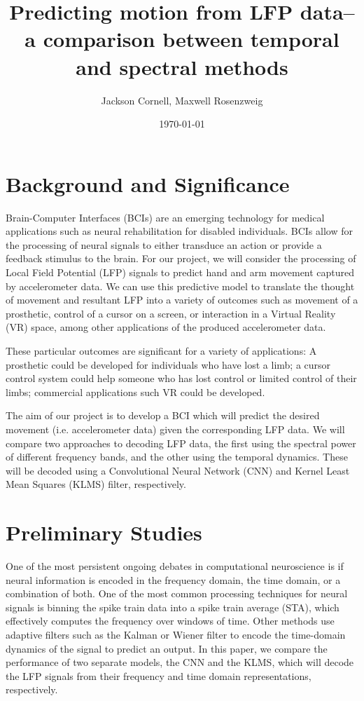 \documentclass[12pt]{article}
\title{Predicting motion from LFP data--a comparison between temporal and spectral methods}
\author{Jackson Cornell, Maxwell Rosenzweig}
\date{\today}
\begin{document}
\maketitle


\section{Background and Significance}

Brain-Computer Interfaces (BCIs) are an emerging technology for medical applications such as neural rehabilitation for disabled individuals. BCIs allow for the processing of neural signals to either transduce an action or provide a feedback stimulus to the brain. For our project, we will consider the processing of Local Field Potential (LFP) signals to predict hand and arm movement captured by accelerometer data. We can use this predictive model to translate the thought of movement and resultant LFP into a variety of outcomes such as movement of a prosthetic, control of a cursor on a screen, or interaction in a Virtual Reality (VR) space, among other applications of the produced accelerometer data.

These particular outcomes are significant for a variety of applications: A prosthetic could be developed for individuals who have lost a limb; a cursor control system could help someone who has lost control or limited control of their limbs; commercial applications such VR could be developed.

The aim of our project is to develop a BCI which will predict the desired movement (i.e. accelerometer data) given the corresponding LFP data. We will compare two approaches to decoding LFP data, the first using the spectral power of different frequency bands, and the other using the temporal dynamics. These will be decoded using a Convolutional Neural Network (CNN) and Kernel Least Mean Squares (KLMS) filter, respectively.


\section{Preliminary Studies}

One of the most persistent ongoing debates in computational neuroscience is if neural information is encoded in the frequency domain, the time domain, or a combination of both. One of the most common processing techniques for neural signals is binning the spike train data into a spike train average (STA), which effectively computes the frequency over windows of time. Other methods use adaptive filters such as the Kalman or Wiener filter to encode the time-domain dynamics of the signal to predict an output. In this paper, we compare the performance of two separate models, the CNN and the KLMS, which will decode the LFP signals from their frequency and time domain representations, respectively.
\end{document}
